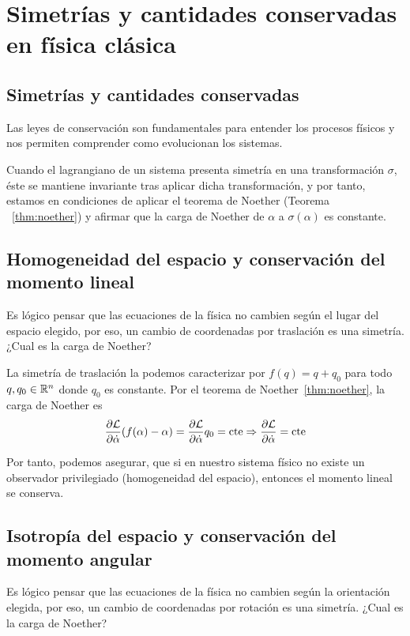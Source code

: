 \chapter{Simetrías y cantidades conservadas en física clásica}\label{ch:simetrias-y-cantidades-conservadas-en-fisica-clasica}

\section{Simetrías y cantidades conservadas}\label{sec:simetrias-y-cantidades-conservadas}

Las leyes de conservación son fundamentales para entender los procesos físicos y nos permiten comprender como evolucionan los sistemas.

Cuando el lagrangiano de un sistema presenta simetría en una transformación $\sigma$, éste se mantiene invariante tras aplicar dicha transformación, y por tanto, estamos en condiciones de aplicar el teorema de Noether (Teorema ~\eqref{thm:noether}) y afirmar que la carga de Noether de $\alpha$ a $\sigma(\alpha)$ es constante.

\section{Homogeneidad del espacio y conservación del momento lineal}\label{sec:homogeneidad-del-espacio-y-conservacion-del-momento-lineal}
Es lógico pensar que las ecuaciones de la física no cambien según el lugar del espacio elegido, por eso, un cambio de coordenadas por traslación es una simetría.
¿Cual es la carga de Noether?

La simetría de traslación la podemos caracterizar por $f(q)=q+q_0$ para todo $q, q_0\in\mathbb{R}^n$ donde $q_0$ es constante.
Por el teorema de Noether~\eqref{thm:noether}, la carga de Noether es
\begin{equation}
	\label{eq:conservacion_momento_lineal}
	\frac{\partial \mathcal{L}}{\partial\dot{\alpha}}(f(\alpha)-\alpha) = \frac{\partial \mathcal{L}}{\partial\dot{\alpha}}q_0=\text{cte}\Rightarrow\frac{\partial \mathcal{L}}{\partial\dot{\alpha}}=\text{cte}
\end{equation}

Por tanto, podemos asegurar, que si en nuestro sistema físico no existe un observador privilegiado (homogeneidad del espacio), entonces el momento lineal se conserva.

\section{Isotropía del espacio y conservación del momento angular}\label{sec:isotropia-del-espacio-y-conservacion-del-momento-angular}
Es lógico pensar que las ecuaciones de la física no cambien según la orientación elegida, por eso, un cambio de coordenadas por rotación es una simetría.
¿Cual es la carga de Noether?

